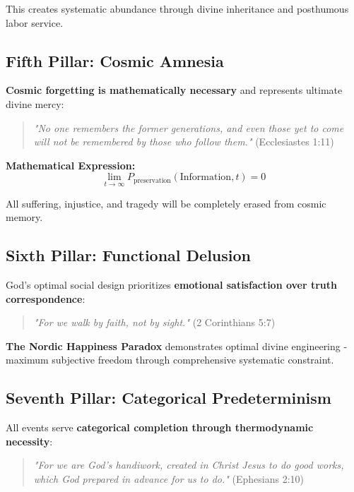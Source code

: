 \documentclass[12pt,a4paper]{article}
\begin{document}
This creates systematic abundance through divine inheritance and posthumous labor service.

\subsection{Fifth Pillar: Cosmic Amnesia}

\textbf{Cosmic forgetting is mathematically necessary} and represents ultimate divine mercy:

\begin{quote}
\textit{"No one remembers the former generations, and even those yet to come will not be remembered by those who follow them."} (Ecclesiastes 1:11)
\end{quote}

\textbf{Mathematical Expression:}
\begin{equation}
\lim_{t \to \infty} P_{\text{preservation}}(\text{Information},t) = 0
\end{equation}

All suffering, injustice, and tragedy will be completely erased from cosmic memory.

\subsection{Sixth Pillar: Functional Delusion}

God's optimal social design prioritizes \textbf{emotional satisfaction over truth correspondence}:

\begin{quote}
\textit{"For we walk by faith, not by sight."} (2 Corinthians 5:7)
\end{quote}

\textbf{The Nordic Happiness Paradox} demonstrates optimal divine engineering - maximum subjective freedom through comprehensive systematic constraint.

\subsection{Seventh Pillar: Categorical Predeterminism}

All events serve \textbf{categorical completion through thermodynamic necessity}:

\begin{quote}
\textit{"For we are God's handiwork, created in Christ Jesus to do good works, which God prepared in advance for us to do."} (Ephesians 2:10)
\end{quote}
\end{document}
